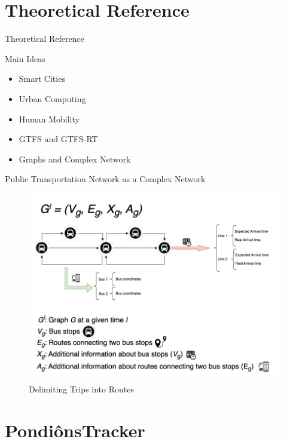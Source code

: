 \documentclass[xcolor=dvipsnames,table]{beamer}
\begin{document}
\section{Theoretical Reference}
\begin{frame}{Theoretical Reference}
        \begin{block}{Main Ideas}
                \begin{itemize}
                        \item Smart Cities
                        \item Urban Computing
                        \item Human Mobility
                        \item GTFS and GTFS-RT
                        \item Graphs and Complex Network
                \end{itemize}
        \end{block}
\end{frame}
\begin{frame}{Public Transportation Network as a Complex Network}
        \begin{figure}[H]
                \centering
                \includegraphics[scale=0.3]{images/final_graph.png}
                \caption{Delimiting Trips into Routes}
        \end{figure}
\end{frame}



\section{PondiônsTracker}
\end{document}
